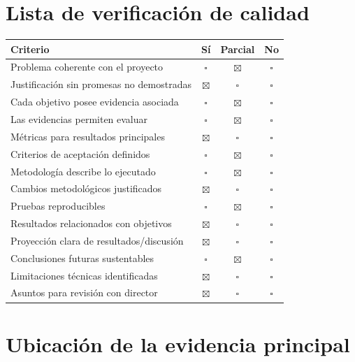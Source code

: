 \documentclass[11pt,letterpaper]{article}
\begin{document}
\section{Lista de verificación de calidad}

\begin{tabularx}{\textwidth}{Xccc}
\toprule
\textbf{Criterio} & \textbf{Sí} & \textbf{Parcial} & \textbf{No}\\
\midrule
Problema coherente con el proyecto & $\square$ & $\boxtimes$ & $\square$\\
Justificación sin promesas no demostradas & $\boxtimes$ & $\square$ & $\square$\\
Cada objetivo posee evidencia asociada & $\square$ & $\boxtimes$ & $\square$\\
Las evidencias permiten evaluar & $\square$ & $\boxtimes$ & $\square$\\
Métricas para resultados principales & $\boxtimes$ & $\square$ & $\square$\\
Criterios de aceptación definidos & $\square$ & $\boxtimes$ & $\square$\\
Metodología describe lo ejecutado & $\square$ & $\boxtimes$ & $\square$\\
Cambios metodológicos justificados & $\boxtimes$ & $\square$ & $\square$\\
Pruebas reproducibles & $\square$ & $\boxtimes$ & $\square$\\
Resultados relacionados con objetivos & $\boxtimes$ & $\square$ & $\square$\\
Proyección clara de resultados/discusión & $\boxtimes$ & $\square$ & $\square$\\
Conclusiones futuras sustentables & $\square$ & $\boxtimes$ & $\square$\\
Limitaciones técnicas identificadas & $\boxtimes$ & $\square$ & $\square$\\
Asuntos para revisión con director & $\boxtimes$ & $\square$ & $\square$\\
\bottomrule
\end{tabularx}

\section{Ubicación de la evidencia principal}
\end{document}
